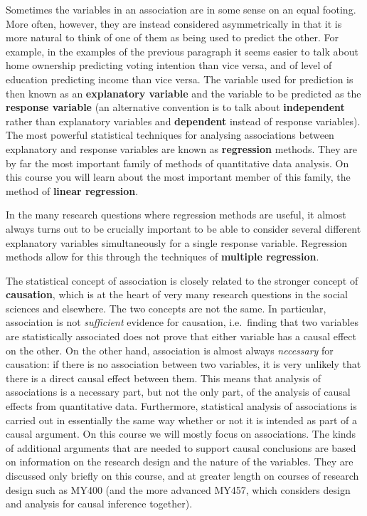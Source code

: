 \documentclass[11pt,a4paper,openany]{book}
\begin{document}
Sometimes the variables in an association are in some sense on an equal
footing. More often, however, they are instead considered asymmetrically
in that it is more natural to think of one of them as being used to
predict the other. For example, in the examples of the previous
paragraph it seems easier to talk about home ownership predicting voting
intention than vice versa, and of level of education predicting income
than vice versa. The variable used for prediction is then known as an
\textbf{explanatory variable} and the variable to be predicted as the
\textbf{response variable} (an alternative convention is to talk about
\textbf{independent} rather than explanatory variables and
\textbf{dependent} instead of response variables). The most powerful
statistical techniques for analysing associations between explanatory
and response variables are known as \textbf{regression} methods. They
are by far the most important family of methods of quantitative data
analysis. On this course you will learn about the most important member
of this family, the method of \textbf{linear regression}.

In the many research questions where regression methods are useful, it
almost always turns out to be crucially important to be able to consider
several different explanatory variables simultaneously for a single
response variable. Regression methods allow for this through the
techniques of \textbf{multiple regression}.

The statistical concept of association is closely related to the
stronger concept of \textbf{causation}, which is at the heart of very
many research questions in the social sciences and elsewhere. The two
concepts are not the same. In particular, association is not
\emph{sufficient} evidence for causation, i.e.~finding that two
variables are statistically associated does not prove that either
variable has a causal effect on the other. On the other hand,
association is almost always \emph{necessary} for causation: if there is
no association between two variables, it is very unlikely that there is
a direct causal effect between them. This means that analysis of
associations is a necessary part, but not the only part, of the analysis
of causal effects from quantitative data. Furthermore, statistical
analysis of associations is carried out in essentially the same way
whether or not it is intended as part of a causal argument. On this
course we will mostly focus on associations. The kinds of additional
arguments that are needed to support causal conclusions are based on
information on the research design and the nature of the variables. They
are discussed only briefly on this course, and at greater length on
courses of research design such as MY400 (and the more advanced MY457,
which considers design and analysis for causal inference together).
\end{document}

